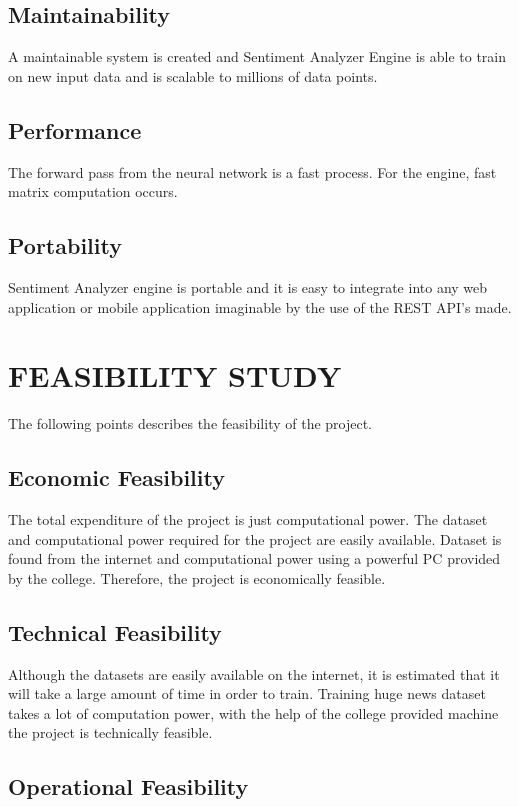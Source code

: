             \subsection{Maintainability}
A maintainable system is created and Sentiment Analyzer Engine is able to train on
new input data and is scalable to millions of data points.
            \subsection{Performance}
The forward pass from the neural network is a fast process. For the engine, fast matrix
computation occurs.
            \subsection{Portability}
Sentiment Analyzer engine is portable and it is easy to integrate into any web
application or mobile application imaginable by the use of the REST API’s made.

        \section{FEASIBILITY STUDY}
The following points describes the feasibility of the project.
            \subsection{Economic Feasibility}
            The total expenditure of the project is just computational power. The dataset and
            computational power required for the project are easily available. Dataset is found from the internet and computational power using a powerful PC provided by the college. Therefore, the project is economically feasible.

            \subsection{Technical Feasibility}
            Although the datasets are easily available on the internet, it is estimated that it will take a large amount of time in order to train. Training huge news dataset takes a lot of computation power, with the help of the college provided machine the project is technically feasible.

            \subsection{Operational Feasibility}
            
